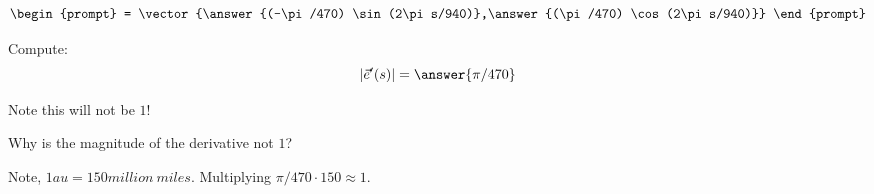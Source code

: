 \documentclass{ximera}
\begin{document}
\begin{exercise}
\begin{exercise}
\begin{exercise}
\begin{exercise}
\[      \begin{prompt}
        = \vector{\answer{(-\pi/470) \sin(2\pi s/940)},\answer{(\pi/470) \cos(2\pi s/940)}}
      \end{prompt}
      \]
      \begin{exercise}
        Compute:
        \[
        |\vec{e}'(s)| = \answer{\pi/470}
        \]
        \begin{feedback}
          Note this will not be $1$!
        \end{feedback}
        \begin{exercise}
          Why is the magnitude of the derivative not $1$?
          \begin{multipleChoice}
          \end{multipleChoice}
          \begin{feedback}
            Note, $1\unit{au} =
            150\unit{million~miles}$. Multiplying $\pi/470\cdot 150
            \approx 1$.
          \end{feedback}
        \end{exercise}
      \end{exercise}
    \end{exercise}
    \end{exercise}
  \end{exercise}
\end{exercise}
\end{document}
